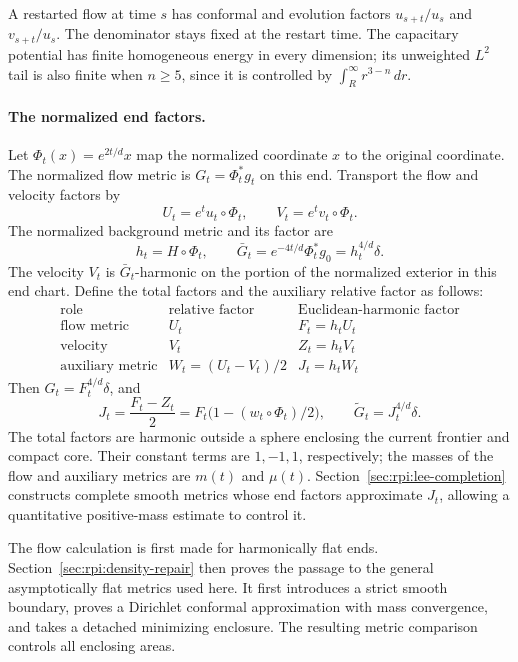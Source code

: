 A restarted flow at
time $s$ has conformal and evolution factors $u_{s+t}/u_s$ and
$v_{s+t}/u_s$. The denominator stays fixed at the restart time.
The capacitary potential has finite homogeneous energy in every
dimension; its unweighted $L^2$ tail is also finite when $n\ge5$,
since it is controlled by $\int_R^\infty r^{3-n}\,dr$.

\paragraph{The normalized end factors.}
Let $\Phi_t(x)=e^{2t/d}x$ map the
normalized coordinate $x$ to the original coordinate. The normalized
flow metric is $G_t=\Phi_t^*g_t$ on this end. Transport the flow and
velocity factors by
\[
 U_t=e^tu_t\circ\Phi_t,\qquad V_t=e^tv_t\circ\Phi_t.
\]
The normalized background metric and its factor are
\[
 h_t=H\circ\Phi_t,\qquad
 \bar G_t=e^{-4t/d}\Phi_t^*g_0=h_t^{4/d}\delta.
\]
The velocity $V_t$ is $\bar G_t$-harmonic on the portion of the
normalized exterior in this end chart.
Define the total factors and the auxiliary relative factor as follows:
\[
\begin{array}{c|c|c}
 \text{role}&\text{relative factor}&\text{Euclidean-harmonic factor}\\ \hline
 \text{flow metric}&U_t&F_t=h_tU_t\\
 \text{velocity}&V_t&Z_t=h_tV_t\\
 \text{auxiliary metric}&W_t=(U_t-V_t)/2&J_t=h_tW_t
\end{array}
\]
Then $G_t=F_t^{4/d}\delta$, and
\[
 J_t=\frac{F_t-Z_t}{2}
     =F_t\bigl(1-(w_t\circ\Phi_t)/2\bigr),\qquad
 \widetilde G_t=J_t^{4/d}\delta.
\]
The total factors are harmonic outside a sphere enclosing the current
frontier and compact core. Their constant terms are $1,-1,1$,
respectively; the masses of the flow and auxiliary metrics are $m(t)$
and $\mu(t)$.
Section~\ref{sec:rpi:lee-completion} constructs complete smooth
metrics whose end factors approximate $J_t$, allowing a quantitative
positive-mass estimate to control it.

The flow calculation is first made for harmonically flat ends.
Section~\ref{sec:rpi:density-repair} then proves the passage to the
general asymptotically flat metrics used here. It first introduces a
strict smooth boundary, proves a Dirichlet conformal approximation
with mass convergence, and takes a detached minimizing enclosure.
The resulting metric comparison controls all enclosing areas.
